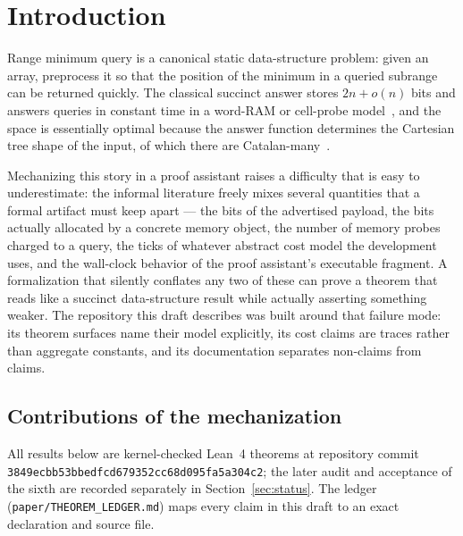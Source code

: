 \documentclass[11pt]{article}
\theoremstyle{definition}
\theoremstyle{remark}
\begin{document}
\section{Introduction}\label{sec:intro}

Range minimum query is a canonical static data-structure problem: given an
array, preprocess it so that the position of the minimum in a queried
subrange can be returned quickly. The classical succinct answer stores
$2n + o(n)$ bits and answers queries in constant time in a word-RAM or
cell-probe model~\cite{FischerHeun11,Fischer10}, and the space is essentially
optimal because the answer function determines the Cartesian tree shape of
the input, of which there are Catalan-many~\cite{Vuillemin80,GBT84}.

Mechanizing this story in a proof assistant raises a difficulty that is
easy to underestimate: the informal literature freely mixes several
quantities that a formal artifact must keep apart --- the bits of the
advertised payload, the bits actually allocated by a concrete memory object,
the number of memory probes charged to a query, the ticks of whatever
abstract cost model the development uses, and the wall-clock behavior of the
proof assistant's executable fragment. A formalization that silently
conflates any two of these can prove a theorem that reads like a succinct
data-structure result while actually asserting something weaker. The
repository this draft describes was built around that failure mode: its
theorem surfaces name their model explicitly, its cost claims are traces
rather than aggregate constants, and its documentation separates non-claims
from claims.

\subsection{Contributions of the mechanization}\label{sec:contributions}

All results below are kernel-checked Lean~4 theorems at repository commit
\nolinkurl{3849ecbb53bbedfcd679352cc68d095fa5a304c2}; the later audit and acceptance of the sixth are recorded separately in Section~\ref{sec:status}. The
ledger (\texttt{paper/THEOREM\_LEDGER.md}) maps every claim in this draft to
an exact declaration and source file.
\end{document}
